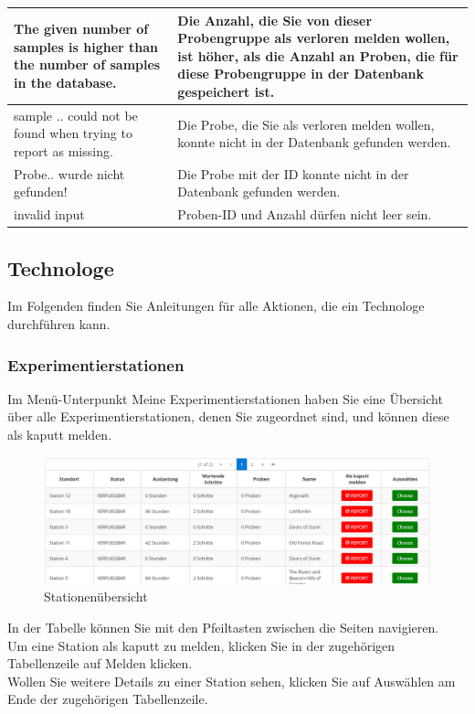\documentclass[enabledeprecatedfontcommands,fontsize=12pt,paper=a4,twoside]{scrartcl}
\begin{document}
\begin{longtable}[c]{|p{5cm}|p{10cm}|}
The given number of samples is higher than the number of samples in the database. &  Die Anzahl, die Sie von dieser Probengruppe als verloren melden wollen, ist höher, als die Anzahl an Proben, die für diese Probengruppe in der Datenbank gespeichert ist. \\ \hline
sample .. could not be found when trying to report as missing. & Die Probe, die Sie als verloren melden wollen, konnte nicht in der Datenbank gefunden werden. \\ \hline
Probe.. wurde nicht gefunden! & Die Probe mit der ID konnte nicht in der Datenbank gefunden werden. \\ \hline
invalid input&Proben-ID und Anzahl dürfen nicht leer sein.  \\ \hline
\end{longtable}
\subsection{Technologe}

Im Folgenden finden Sie Anleitungen für alle Aktionen, die ein Technologe durchführen kann. \\

\subsubsection{Experimentierstationen}
Im Menü-Unterpunkt Meine Experimentierstationen haben Sie eine Übersicht über alle Experimentierstationen, denen Sie zugeordnet sind, und können diese als kaputt melden. \\

\begin{figure}[h!]
\begin{center}
 \includegraphics[width=\textwidth]{screenshots/t/stationen.png}
  \caption{Stationenübersicht}
  \label{fig:boat1}
\end{center}
\end{figure}

In der Tabelle können Sie mit den Pfeiltasten zwischen die Seiten navigieren. \\
Um eine Station als kaputt zu melden, klicken Sie in der zugehörigen Tabellenzeile auf Melden klicken. \\
Wollen Sie weitere Details zu einer Station sehen, klicken Sie auf Auswählen am Ende der zugehörigen Tabellenzeile. \\
\end{document}
